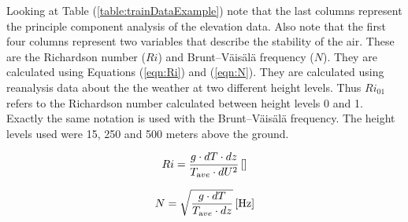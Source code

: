 \begin{table}[h]
    \caption{An example of data structure used with model}
    \label{table:trainDataExample}
\end{table}

Looking at Table (\ref{table:trainDataExample}) note that the last \nPCA columns represent the principle component analysis of the elevation data. Also note that the first four columns represent two variables that describe the stability of the air. These are the Richardson number ($Ri$)\cite{richardson_number_skybrary} and Brunt–Väisälä frequency\cite{brunt_vaisala_freq_eumtrain} ($N$). They are calculated using Equations (\ref{eqn:Ri}) and (\ref{eqn:N})\cite{mean_gust_HA_HO}. They are calculated using reanalysis data about the the weather at two different height levels. Thus $Ri_{01}$ refers to the Richardson number calculated between height levels 0 and 1. Exactly the same notation is used with the Brunt–Väisälä frequency. The height levels used were 15, 250 and 500 meters above the ground.

\begin{equation}
    \label{eqn:Ri}
    Ri = \frac{g \cdot dT \cdot dz}{T_{\textrm ave} \cdot dU^2} \, \mathrm{[]}
\end{equation}

\begin{equation}
    \label{eqn:N}
    N = \sqrt{\frac{g \cdot dT }{T_{\textrm ave} \cdot dz}} \, \mathrm{[Hz]}
\end{equation}

